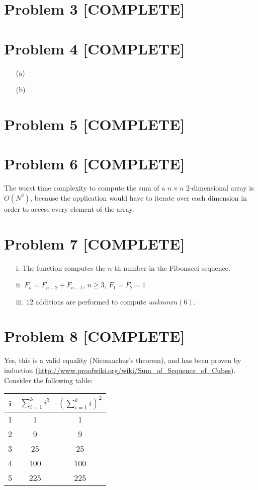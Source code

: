 \documentclass{article}
\begin{document}
\section*{Problem 3 [COMPLETE]}



\section*{Problem 4 [COMPLETE]}

\begin{enumerate}
  \item[(a)] 
  \item[(b)] 
\end{enumerate}

\section*{Problem 5 [COMPLETE]}



\section*{Problem 6 [COMPLETE]}

The worst time complexity to compute the sum of a $n \times n$ 2-dimensional array is $O(N^2)$, because the application would have to iterate over each dimension in order to access every element of the array.

\section*{Problem 7 [COMPLETE]}

\begin{enumerate}
  \item[i.] The function computes the $n$-th number in the Fibonacci sequence.
  \item[ii.] $F_n = F_{n - 2} + F_{n - 1}$, $n \ge 3$, $F_1 = F_2 = 1$
  \item[iii.] $12$ additions are performed to compute $unknown(6)$.
\end{enumerate}

\pagebreak
\section*{Problem 8 [COMPLETE]}

Yes, this is a valid equality (Nicomachus's theorem), and has been proven by induction (\url{http://www.proofwiki.org/wiki/Sum_of_Sequence_of_Cubes}). Consider the following table: \\

\begin{center}
\begin{tabularx}{1.5in}{c||c|c}
i & $\displaystyle\sum\limits_{i = 1}^{k} i^3$ & $\left(\displaystyle\sum\limits_{i = 1}^{k} i\right)^2$ \\[1.5em]
\hline
1 &   1 &   1 \\
2 &   9 &   9 \\
3 &  25 &  25 \\
4 & 100 & 100 \\
5 & 225 & 225 
\end{tabularx}
\end{center}
\end{document}
